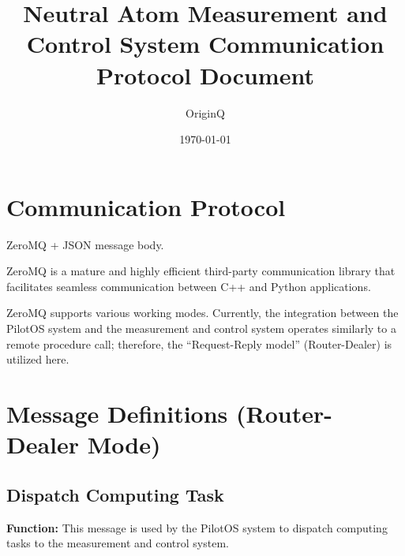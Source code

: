 \documentclass[12pt, a4paper]{article}
\title{\textbf{Neutral Atom Measurement and Control System Communication Protocol Document}}
\author{OriginQ}
\date{\today}
\begin{document}
\maketitle
\tableofcontents
\newpage

\section{Communication Protocol}

ZeroMQ + JSON message body.

ZeroMQ is a mature and highly efficient third-party communication library that facilitates seamless communication between C++ and Python applications.

ZeroMQ supports various working modes. Currently, the integration between the PilotOS system and the measurement and control system operates similarly to a remote procedure call; therefore, the ``Request-Reply model'' (Router-Dealer) is utilized here.

\section{Message Definitions (Router-Dealer Mode)}

\subsection{Dispatch Computing Task}

\textbf{Function:} This message is used by the PilotOS system to dispatch computing tasks to the measurement and control system.
\end{document}
